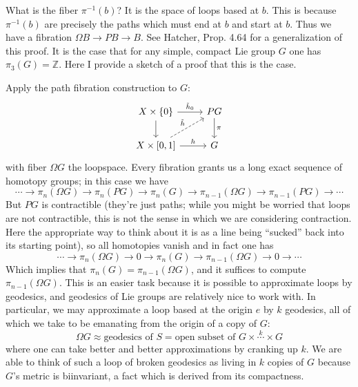 \documentclass{report}
\begin{document}
What is the fiber $ \pi^{-1}(b) $? It is the space of loops based at $ b $. 
This is because $ \pi^{-1}(b) $ are precisely the paths which must end at $ b $
and start at $ b $. Thus we have a fibration $ \Omega B \to PB \to B $. 
See Hatcher, Prop. 4.64 for a generalization of this proof.
It is the case that for any simple, compact Lie group $ G $ one has $ \pi_3(G) 
= \mathbb{Z} $. Here I provide a sketch of a proof that this is the case. 

Apply the path fibration construction to $ G $:
\begin{equation*}
	\begin{tikzcd}
	X\times \left\{0\right\} \arrow[r, "\tilde{h}_0"] \arrow[d]
		& PG \arrow[d, "\pi"] \\
	X\times\left[0, 1\right] \arrow[r, "h"] \arrow[from=2-1, to=1-2, "\tilde{h}", dashrightarrow]
		& G
	\end{tikzcd}
\end{equation*}
with fiber $ \Omega G $ the loopspace. Every fibration grants us a long exact 
sequence of homotopy groups; in this case we have 
\begin{equation*}
	\cdots \to \pi_n(\Omega G) \to \pi_n(PG) \to \pi_n(G) \to \pi_{n-1}(\Omega G) 
	\to \pi_{n-1}(PG)\to \cdots 
\end{equation*}
But $ PG $ is contractible (they're just paths; while you might be worried that 
loops are not contractible, this is not the sense in which we are considering 
contraction. Here the appropriate way to think about it is as a line being
``sucked'' back into its starting point), so all homotopies 
vanish and in fact one has 
\begin{equation}\label{eq:pi3-z-les}
	\cdots \to \pi_n(\Omega G) \to 0 \to \pi_n(G) \to \pi_{n-1}(\Omega G) 
	\to 0 \to \cdots 
\end{equation}
Which implies that $ \pi_n(G) = \pi_{n-1}(\Omega G) $, and it suffices to compute 
$ \pi_{n-1}(\Omega G) $. This is an easier task because it is possible to 
approximate loops by geodesics, and geodesics of Lie groups are relatively
nice to work with. In particular, we may approximate a loop based at the origin 
$ e $ by $ k $ geodesics, all of which we take to be emanating from the origin 
of a copy of $ G $:
\begin{equation*}
	\Omega G \approx \text{geodesics of } S =\text{open subset of } G\times \overset{k}{\cdots}\times G
\end{equation*}
where one can take better and better approximations by cranking up $ k $. 
We are able to think of such a loop of broken geodesics as living in $ k $ 
copies of $ G $ because $ G $'s metric is biinvariant, a fact which is derived 
from its compactness.
\end{document}
